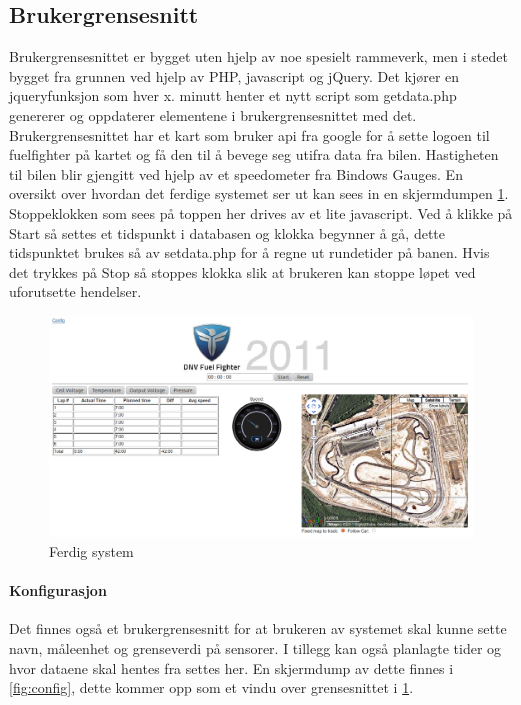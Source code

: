 \subsection{Brukergrensesnitt}
Brukergrensesnittet er bygget uten hjelp av noe spesielt rammeverk, men i stedet bygget fra grunnen ved hjelp av PHP, javascript og jQuery\cite{jquery}. Det kjører en jqueryfunksjon som hver x. minutt henter et nytt script som getdata.php genererer og oppdaterer elementene i brukergrensesnittet med det. Brukergrensesnittet har et kart som bruker api fra google for å sette logoen til fuelfighter på kartet og få den til å bevege seg utifra data fra bilen. Hastigheten til bilen blir gjengitt ved hjelp av et speedometer fra Bindows Gauges\cite{bindows}. En oversikt over hvordan det ferdige systemet ser ut kan sees in en skjermdumpen \ref{fig:gui}. Stoppeklokken som sees på toppen her drives av et lite javascript. Ved å klikke på Start så settes et tidspunkt i databasen og klokka begynner å gå, dette tidspunktet brukes så av setdata.php for å regne ut rundetider på banen. Hvis det trykkes på Stop så stoppes klokka slik at brukeren kan stoppe løpet ved uforutsette hendelser.

\begin{figure}[H]
\includegraphics[width=\textwidth]{images/gui.png}
\caption{Ferdig system} 
\label{fig:gui}
\end{figure}

\paragraph{Konfigurasjon}
Det finnes også et brukergrensesnitt for at brukeren av systemet skal kunne sette navn, måleenhet og grenseverdi på sensorer. I tillegg kan også planlagte tider og hvor dataene skal hentes fra settes her.
En skjermdump av dette finnes i \ref{fig:config}, dette kommer opp som et vindu over grensesnittet i \ref{fig:gui}.

